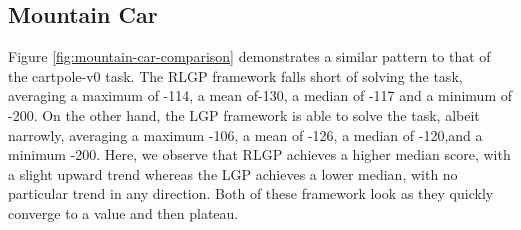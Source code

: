 \documentclass[12pt, final]{dalcsthesis}
\begin{document}

\subsection{Mountain Car}

Figure \ref{fig:mountain-car-comparison} demonstrates a similar pattern to that of the cartpole-v0 task. The RLGP framework falls short of solving the task, averaging a maximum of -114, a mean of-130, a median of -117 and a minimum of -200. On the other hand, the LGP framework is able to solve the task, albeit narrowly, averaging a maximum -106, a mean of -126, a median of -120,and a minimum -200. Here, we observe that RLGP achieves a higher median score, with a slight upward trend whereas the LGP achieves a lower median, with no particular trend in any direction. Both of these framework look as they quickly converge to a value and then plateau.
\end{document}
